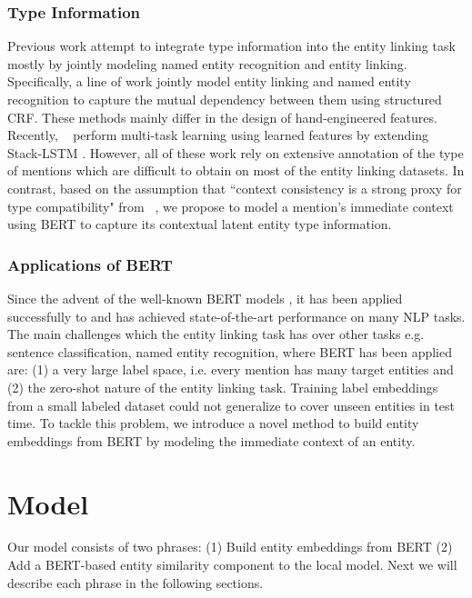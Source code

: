 \documentclass[letterpaper]{article} \usepackage{aaai20}  \usepackage{times}  \usepackage{helvet} \usepackage{courier}  \usepackage[hyphens]{url}  \usepackage{graphicx} \urlstyle{rm} \def\UrlFont{\rm}  \usepackage{graphicx}  \frenchspacing  \setlength{\pdfpagewidth}{8.5in}  \setlength{\pdfpageheight}{11in}  \usepackage{multirow}
\newcommand{\namecite}[1]{\citeauthor{#1}~\shortcite{#1}}
\begin{document}
    \subsubsection{Type Information}
    Previous work attempt to integrate type information into the entity linking task mostly by jointly modeling named entity recognition and entity linking. Specifically, a line of work \cite{durrett-klein-2014-joint,luo2015joint,nguyen2016j} jointly model entity linking and named entity recognition to capture the mutual dependency between them using structured CRF. These methods mainly differ in the design of hand-engineered features. Recently, \namecite{martins-etal-2019-joint} perform multi-task learning using learned features by extending Stack-LSTM \cite{dyer-etal-2015-transition}. However, all of these work rely on extensive annotation of the type of mentions which are difficult to obtain on most of the entity linking datasets. In contrast, based on the assumption that ``context consistency is a strong proxy for type compatibility" from \namecite{zhou-etal-2018-zero}, we propose to model a mention's immediate context using BERT \cite{devlin-etal-2019-bert} to capture its contextual latent entity type information.
    \subsubsection{Applications of BERT}
    Since the advent of the well-known BERT models \cite{devlin-etal-2019-bert}, it has been applied successfully to and has achieved state-of-the-art performance on many NLP tasks. 
    The main challenges which the entity linking task has over other tasks e.g. sentence classification, named entity recognition, where BERT has been applied are: (1) a very large label space, i.e. every mention has many target entities and (2) the zero-shot nature of the entity linking task. Training label embeddings from a small labeled dataset could not generalize to cover unseen entities in test time. To tackle this problem, we introduce a novel method to build entity embeddings from BERT by modeling the immediate context of an entity. 


\section{Model}
Our model consists of two phrases: (1) Build entity embeddings from BERT (2) Add a BERT-based entity similarity component to the local model. Next we will describe each phrase in the following sections.
\end{document}
